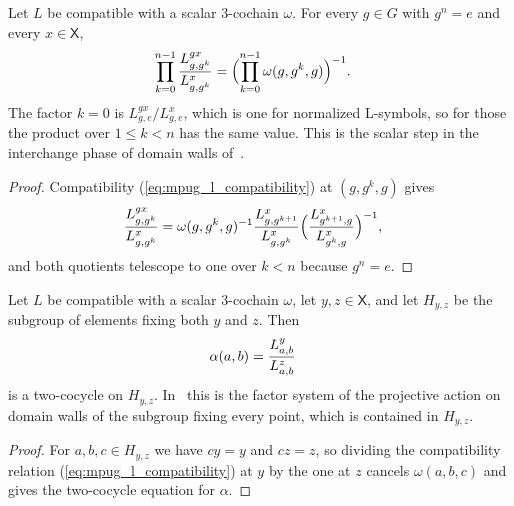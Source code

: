 \begin{lemma}
    \label{thm:mpug_domain_wall_interchange}
    \leanok
    Let $L$ be compatible with a scalar $3$-cochain $\omega$. For every
    $g\in G$ with $g^n=e$ and every $x\in\mathsf X$,
    \begin{align}
        \prod_{k=0}^{n-1}\frac{L^{gx}_{g,g^k}}{L^x_{g,g^k}}
         & =\Bigl(\prod_{k=0}^{n-1}\omega(g,g^k,g)\Bigr)^{-1}.
        \notag
    \end{align}
    The factor $k=0$ is $L^{gx}_{g,e}/L^x_{g,e}$, which is one for normalized
    L-symbols, so for those the product over $1\leq k<n$ has the same value.
    This is the scalar step in the interchange phase of domain walls
    of~\cite[Section~IV.C]{GarreRubioSchuch2024DomainWall}.
\end{lemma}
\begin{proof}\leanok
    Compatibility (\ref{eq:mpug_l_compatibility}) at $(g,g^k,g)$ gives
    \begin{align}
        \frac{L^{gx}_{g,g^k}}{L^x_{g,g^k}}
         & =\omega(g,g^k,g)^{-1}
        \frac{L^x_{g,g^{k+1}}}{L^x_{g,g^k}}
        \Bigl(\frac{L^x_{g^{k+1},g}}{L^x_{g^k,g}}\Bigr)^{-1},
        \notag
    \end{align}
    and both quotients telescope to one over $k<n$ because $g^n=e$.
\end{proof}

\begin{lemma}
    \label{thm:mpug_domain_wall_projective}
    \leanok
    Let $L$ be compatible with a scalar $3$-cochain $\omega$, let
    $y,z\in\mathsf X$, and let $H_{y,z}$ be the subgroup of elements fixing
    both $y$ and $z$. Then
    \begin{align}
        \alpha(a,b)
         & =\frac{L^y_{a,b}}{L^z_{a,b}}
        \notag
    \end{align}
    is a two-cocycle on $H_{y,z}$. In~\cite[Section~IV.C]{GarreRubioSchuch2024DomainWall}
    this is the factor system of the projective action on domain walls of the
    subgroup fixing every point, which is contained in $H_{y,z}$.
\end{lemma}
\begin{proof}\leanok
    For $a,b,c\in H_{y,z}$ we have $cy=y$ and $cz=z$, so dividing the
    compatibility relation (\ref{eq:mpug_l_compatibility}) at $y$ by the one at
    $z$ cancels $\omega(a,b,c)$ and gives the two-cocycle equation for
    $\alpha$.
\end{proof}

